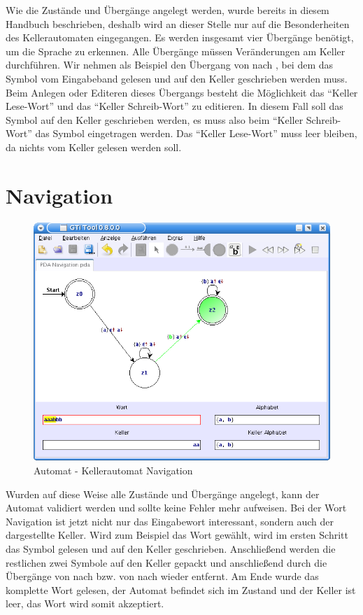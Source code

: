 Wie die Zustände und Übergänge angelegt werden, wurde bereits in diesem Handbuch
beschrieben, deshalb wird an dieser Stelle nur auf die Besonderheiten des
Kellerautomaten eingegangen. Es werden insgesamt vier Übergänge benötigt, um die
Sprache zu erkennen. Alle Übergänge müssen Veränderungen am Keller durchführen.
Wir nehmen als Beispiel den Übergang von  nach , bei dem das
Symbol  vom Eingabeband gelesen und auf den Keller geschrieben werden
muss. Beim Anlegen oder Editeren dieses Übergangs besteht die Möglichkeit das
"`Keller Lese-Wort"' und das "`Keller Schreib-Wort"' zu editieren. In diesem Fall
soll das Symbol  auf den Keller geschrieben werden, es muss also beim
"`Keller Schreib-Wort"' das Symbol  eingetragen werden. Das "`Keller
Lese-Wort"' muss leer bleiben, da nichts vom Keller gelesen werden
soll.\vspace{10pt}


\section{Navigation}

\begin{figure}[h]
\begin{center}
\includegraphics[width=12cm]{../images/pda_navigation.png}
\caption{Automat - Kellerautomat Navigation}
\end{center}
\end{figure}

Wurden auf diese Weise alle Zustände und Übergänge angelegt, kann der Automat
validiert werden und sollte keine Fehler mehr aufweisen. Bei der Wort
Navigation ist jetzt nicht nur das Eingabewort interessant, sondern auch der
dargestellte Keller. Wird zum Beispiel das Wort  gewählt, wird im
ersten Schritt das Symbol  gelesen und auf den Keller geschrieben.
Anschließend werden die restlichen zwei Symbole  auf den Keller
gepackt und anschließend durch die Übergänge von  nach 
bzw. von  nach  wieder entfernt. Am Ende wurde das
komplette Wort  gelesen, der Automat befindet sich im Zustand
 und der Keller ist leer, das Wort wird somit akzeptiert.



